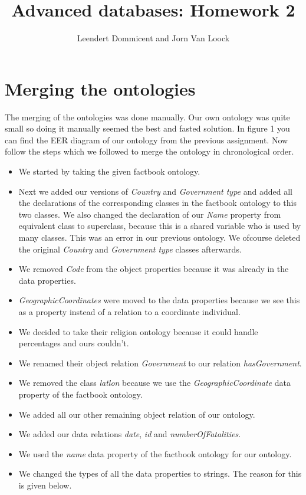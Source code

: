 \documentclass{article}
\title{Advanced databases: Homework 2}
\author{Leendert Dommicent and Jorn Van Loock}
\begin{document}
\maketitle
\section{Merging the ontologies}
The merging of the ontologies was done manually. Our own ontology was quite small so doing it manually seemed the best and fasted solution. In figure 1 you can find the EER diagram of our ontology from the previous assignment. Now follow the steps which we followed to merge the ontology in chronological order.
\begin{itemize}
\item We started by taking the given factbook ontology.
\item Next we added our versions of \textit{Country} and \textit{Government type} and added all the declarations of the corresponding classes in the factbook ontology to this two classes. We also changed the declaration of our \textit{Name} property from equivalent class to superclass, because this is a shared variable who is used by many classes. This was an error in our previous ontology. We ofcourse deleted the original \textit{Country} and \textit{Government type} classes afterwards.
\item We removed \textit{Code} from the object properties because it was already in the data properties.
\item \textit{GeographicCoordinates} were moved to the data properties because we see this as a property instead of a relation to a coordinate individual.
\item We decided to take their religion ontology because it could handle percentages and ours couldn't.
\item We renamed their object relation \textit{Government} to our relation \textit{hasGovernment}.
\item We removed the class \textit{latlon} because we use the \textit{GeographicCoordinate} data property of the factbook ontology.
\item We added all our other remaining object relation of our ontology.
\item We added our data relations \textit{date}, \textit{id} and \textit{numberOfFatalities}.
\item We used the \textit{name} data property of the factbook ontology for our ontology.
\item We changed the types of all the data properties to strings. The reason for this is given below.
\end{itemize}
\end{document}
